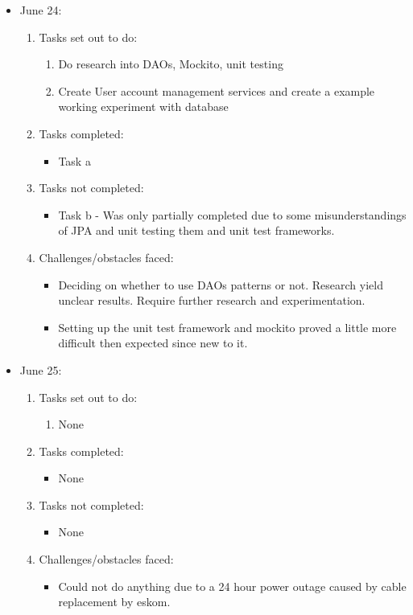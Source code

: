 	\begin{itemize}
		\item June 24:
		\begin{enumerate}
			\item Tasks set out to do:
			\begin{enumerate}
				\item Do research into DAOs, Mockito, unit testing
				\item Create User account management services and create a example working experiment with database				
			\end{enumerate}
			\item Tasks completed:
			\begin{itemize}
				\item Task a
			\end{itemize}
			\item Tasks not completed:
			\begin{itemize}
				\item Task b - Was only partially completed due to some misunderstandings of JPA and unit testing them and unit test frameworks.
			\end{itemize}
			\item Challenges/obstacles faced:
			\begin{itemize}
				\item Deciding on whether to use DAOs patterns or not. Research yield unclear results. Require further research and experimentation.
				\item Setting up the unit test framework and mockito proved a little more difficult then expected since new to it.				
			\end{itemize}			
		\end{enumerate}
	\end{itemize}
	
	\begin{itemize}
		\item June 25:
		\begin{enumerate}
			\item Tasks set out to do:
			\begin{enumerate}
				\item None
			\end{enumerate}
			\item Tasks completed:
			\begin{itemize}
				\item None
			\end{itemize}
			\item Tasks not completed:
			\begin{itemize}
				\item None
			\end{itemize}
			\item Challenges/obstacles faced:
			\begin{itemize}
				\item Could not do anything due to a 24 hour power outage caused by cable replacement by eskom.
			\end{itemize}			
		\end{enumerate}
	\end{itemize}
	
